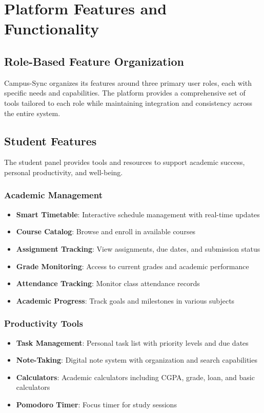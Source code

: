 \chapter{Platform Features and Functionality}

\section{Role-Based Feature Organization}

Campus-Sync organizes its features around three primary user roles, each with specific needs and capabilities. The platform provides a comprehensive set of tools tailored to each role while maintaining integration and consistency across the entire system.

\section{Student Features}

The student panel provides tools and resources to support academic success, personal productivity, and well-being.

\subsection{Academic Management}

\begin{itemize}
    \item \textbf{Smart Timetable}: Interactive schedule management with real-time updates
    \item \textbf{Course Catalog}: Browse and enroll in available courses
    \item \textbf{Assignment Tracking}: View assignments, due dates, and submission status
    \item \textbf{Grade Monitoring}: Access to current grades and academic performance
    \item \textbf{Attendance Tracking}: Monitor class attendance records
    \item \textbf{Academic Progress}: Track goals and milestones in various subjects
\end{itemize}

\subsection{Productivity Tools}

\begin{itemize}
    \item \textbf{Task Management}: Personal task list with priority levels and due dates
    \item \textbf{Note-Taking}: Digital note system with organization and search capabilities
    \item \textbf{Calculators}: Academic calculators including CGPA, grade, loan, and basic calculators
    \item \textbf{Pomodoro Timer}: Focus timer for study sessions
\end{itemize}

